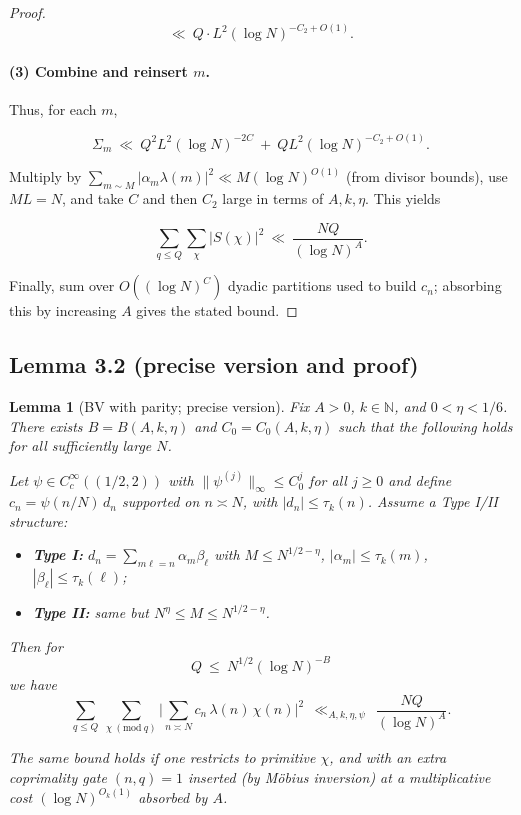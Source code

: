 \documentclass[11pt]{article}
\newtheorem{lemma}{Lemma}[part]
\theoremstyle{definition}
\theoremstyle{remark}
\numberwithin{equation}{part}
\begin{document}
\begin{proof}
	$$
		\ll\ Q\cdot L^2 (\log N)^{-C_2+O(1)}.
	$$

	\paragraph{(3) Combine and reinsert $m$.}
	Thus, for each $m$,

	$$
		\Sigma_m\ \ll\ Q^2 L^2 (\log N)^{-2C} \ +\ Q L^2 (\log N)^{-C_2+O(1)}.
	$$

	Multiply by $\sum_{m\sim M}|\alpha_m\lambda(m)|^2\ll M(\log N)^{O(1)}$ (from divisor bounds), use $ML=N$, and take $C$ and then $C_2$ large in terms of $A,k,\eta$. This yields

	$$
		\sum_{q\le Q}\sum_{\chi}|S(\chi)|^2\ \ll\ \frac{NQ}{(\log N)^A}.
	$$

	Finally, sum over $O((\log N)^C)$ dyadic partitions used to build $c_n$; absorbing this by increasing $A$ gives the stated bound.
\end{proof}

\subsection{Lemma 3.2 (precise version and proof)}

\begin{lemma}[BV with parity; precise version]\label{lem:BV-parity-precise}
	Fix $A>0$, $k\in\mathbb N$, and $0<\eta<1/6$. There exists $B=B(A,k,\eta)$ and $C_0=C_0(A,k,\eta)$ such that the following holds for all sufficiently large $N$.

	Let $\psi\in C_c^\infty((1/2,2))$ with $\|\psi^{(j)}\|_\infty\le C_0^{j}$ for all $j\ge 0$ and define $c_n = \psi(n/N)\,d_n$ supported on $n\asymp N$, with $|d_n|\le \tau_k(n)$. Assume a Type I/II structure:

	\begin{itemize}
		\item \textbf{Type I:} $d_n=\sum_{m\ell=n}\alpha_m\beta_\ell$ with $M\le N^{1/2-\eta}$, $|\alpha_m|\le \tau_k(m)$, $|\beta_\ell|\le \tau_k(\ell)$;
		\item \textbf{Type II:} same but $N^{\eta}\le M\le N^{1/2-\eta}$.
	\end{itemize}

	Then for
	\[
		Q\ \le\ N^{1/2}(\log N)^{-B}
	\]
	we have
	\[
		\sum_{q\le Q}\ \sum_{\chi\ (\mathrm{mod}\ q)}\Bigg|\sum_{n\asymp N} c_n\,\lambda(n)\,\chi(n)\Bigg|^2\ \ \ll_{A,k,\eta,\psi}\ \ \frac{NQ}{(\log N)^A}.
	\]

	The same bound holds if one restricts to primitive $\chi$, and with an extra coprimality gate $(n,q)=1$ inserted (by Möbius inversion) at a multiplicative cost $(\log N)^{O_{k}(1)}$ absorbed by $A$.
\end{lemma}
\end{document}
